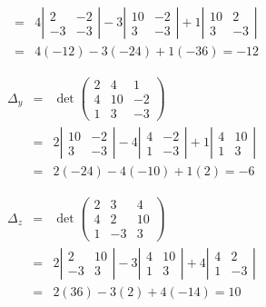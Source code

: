 \documentclass[12pt]{article}
\begin{document}
\begin{multicols}{2}
\begin{enumerate}[A.]
\begin{eqnarray*}
				&=& 4 \left|\begin{array}{rr}
						2 & -2 \\
						-3 & -3
					\end{array}\right| 
					-3 \left|\begin{array}{rr}
						10 & -2 \\
						3 & -3
					\end{array}\right| 
					+1 \left|\begin{array}{rr}
						10 & 2 \\
						3 & -3
					\end{array}\right| \\
				&=&  4(-12) -3(-24) +1(-36) = -12
		\end{eqnarray*}
		
		\begin{eqnarray*}
			\Delta_y &=& \det \left(\begin{array}{rrr}
						2 & 4 & 1 \\
						4 & 10 & -2 \\
						1 & 3 & -3
						\end{array}\right)   \\
				&=& 2 \left|\begin{array}{rr}
						10 & -2 \\
						3 & -3
					\end{array}\right| 
					-4 \left|\begin{array}{rr}
						4 & -2 \\
						1 & -3
					\end{array}\right| 
					+1 \left|\begin{array}{rr}
						4 & 10 \\
						1 & 3
					\end{array}\right| \\
				&=&   2(-24) -4(-10) +1(2) = -6
		\end{eqnarray*}
		
		\begin{eqnarray*}
			\Delta_z &=& \det\left(\begin{array}{rrr}
						2 & 3 & 4 \\
						4 & 2 & 10 \\
						1 & -3 & 3
						\end{array}\right)   \\
				&=& 2 \left|\begin{array}{rr}
						2 & 10 \\
						-3 & 3
					\end{array}\right| 
					-3 \left|\begin{array}{rr}
						4 & 10 \\
						1 & 3
					\end{array}\right| 
					+4 \left|\begin{array}{rr}
						4 & 2 \\
						1 & -3
					\end{array}\right| \\
				&=&  2(36) -3(2) +4(-14) = 10
		\end{eqnarray*}
		

\end{enumerate}
\end{multicols}
\end{document}
